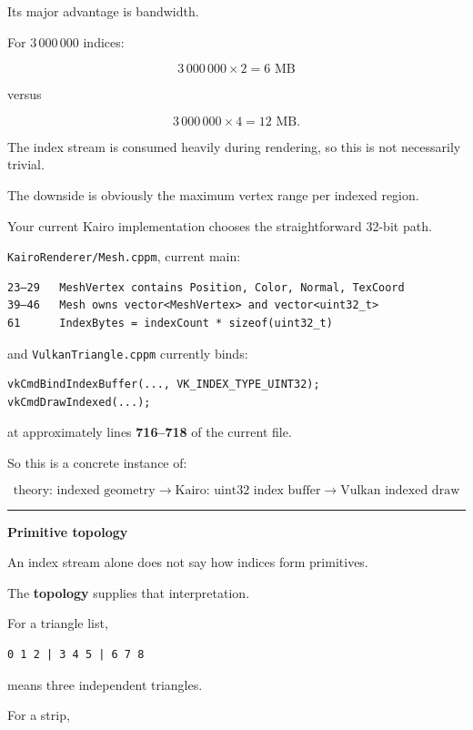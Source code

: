 Its major advantage is bandwidth.

For \(3\,000\,000\) indices:

\[
3\,000\,000\times2 = 6\text{ MB}
\]

versus

\[
3\,000\,000\times4 = 12\text{ MB}.
\]

The index stream is consumed heavily during rendering, so this is not necessarily trivial.

The downside is obviously the maximum vertex range per indexed region.

Your current Kairo implementation chooses the straightforward 32-bit path.

\texttt{KairoRenderer/Mesh.cppm}, current main:

\begin{verbatim}
23–29   MeshVertex contains Position, Color, Normal, TexCoord
39–46   Mesh owns vector<MeshVertex> and vector<uint32_t>
61      IndexBytes = indexCount * sizeof(uint32_t)
\end{verbatim}

and \texttt{VulkanTriangle.cppm} currently binds:

\begin{verbatim}
vkCmdBindIndexBuffer(..., VK_INDEX_TYPE_UINT32);
vkCmdDrawIndexed(...);
\end{verbatim}

at approximately lines \textbf{716--718} of the current file.

So this is a concrete instance of:

\[
\boxed{\text{theory: indexed geometry}
\rightarrow
\text{Kairo: uint32 index buffer}
\rightarrow
\text{Vulkan indexed draw}}
\]

\begin{center}\rule{0.5\linewidth}{0.5pt}\end{center}

\textbf{Primitive topology}

An index stream alone does not say how indices form primitives.

The \textbf{topology} supplies that interpretation.

For a triangle list,

\begin{verbatim}
0 1 2 | 3 4 5 | 6 7 8
\end{verbatim}

means three independent triangles.

For a strip,

